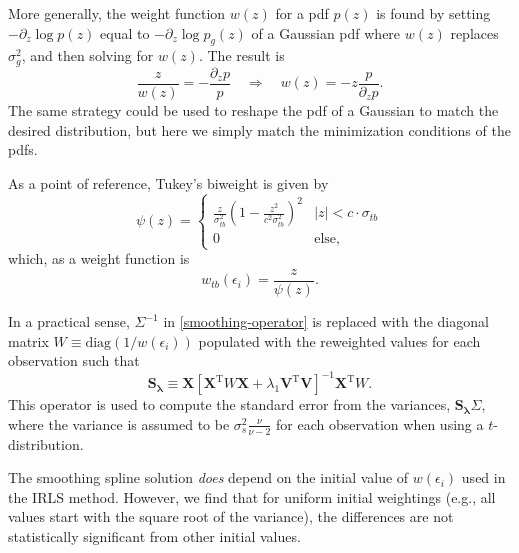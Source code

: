 \documentclass{ametsoc}
\begin{document}
More generally, the weight function $w(z)$ for a pdf $p(z)$ is found by setting $-\partial_z \log p(z)$ equal to $-\partial_z \log p_g(z)$ of a Gaussian pdf where $w(z)$ replaces $\sigma_g^2$,
and then solving for $w(z)$. The result is
\begin{equation}
    \frac{z}{w(z)} = - \frac{\partial_z p}{p}
\quad \Rightarrow \quad
    w(z) = -z \frac{p}{\partial_z p}.
\end{equation}
The same strategy could be used to reshape the pdf of a Gaussian to match the desired distribution, but here we simply match the minimization conditions of the pdfs.

As a point of reference, Tukey's biweight is given by
\begin{equation}
\label{tukey-biweight}
\psi(z) = 
\begin{cases}
\frac{z}{\sigma_{tb}^2} \left(1-\frac{z^2}{c^2 \sigma_{tb}^2} \right)^2 & |z| < c \cdot \sigma_{tb} \\
0 & \textrm{else},
\end{cases}
\end{equation}
which, as a weight function is
\begin{equation}
    w_{tb}(\epsilon_i) = \frac{z}{\psi(z)}.
\end{equation}

In a practical sense, $\Sigma^{-1}$ in \eqref{smoothing-operator} is replaced with the diagonal matrix $W\equiv\textrm{diag}(1/w(\epsilon_i))$ populated with the reweighted values for each observation such that
\begin{equation}
\label{general-smoothing-operator}
\mathbf{S_\lambda} \equiv \mathbf{X} \left[ \mathbf{X}^{\textrm{T}} W \mathbf{X} + \lambda_1 \mathbf{V}^{\textrm{T}} \mathbf{V} \right]^{-1} \mathbf{X}^{\textrm{T}} W.
\end{equation}
This operator is used to compute the standard error from the variances,  $\mathbf{S_\lambda} \Sigma$, where the variance is assumed to be $\sigma_s^2 \frac{\nu}{\nu-2}$ for each observation when using a $t$-distribution.

The smoothing spline solution \emph{does} depend on the initial value of $w(\epsilon_i)$ used in the IRLS method. However, we find that for uniform initial weightings (e.g., all values start with the square root of the variance), the differences are not statistically significant from other initial values.

\appendix[C]
\label{appendixC:variance_estimate}
\end{document}
